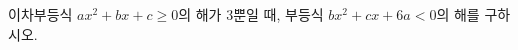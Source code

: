 \hspace*{2mm}\begin{minipage}[t]{\dimexpr\linewidth-2mm\relax}\vspace{0pt}
이차부등식 $ax^2+bx+c\ge 0$의 해가 $3$뿐일 때, 부등식 $bx^2+cx+6a<0$의 해를 구하시오. \end{minipage}
